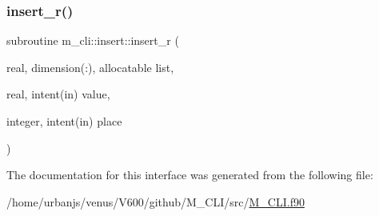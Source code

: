 \mbox{\label{interfacem__cli_1_1insert_af953a8b23ca38f6a5e123d616ad80964}} 
\subsubsection{\texorpdfstring{insert\+\_\+r()}{insert\_r()}}
{\footnotesize\ttfamily subroutine m\+\_\+cli\+::insert\+::insert\+\_\+r (\begin{DoxyParamCaption}\item[{real, dimension(\+:), allocatable}]{list,  }\item[{real, intent(in)}]{value,  }\item[{integer, intent(in)}]{place }\end{DoxyParamCaption})\hspace{0.3cm}{\ttfamily [private]}}



The documentation for this interface was generated from the following file\+:\begin{DoxyCompactItemize}
\item 
/home/urbanjs/venus/\+V600/github/\+M\+\_\+\+C\+L\+I/src/\mbox{\hyperlink{M__CLI_8f90}{M\+\_\+\+C\+L\+I.\+f90}}\end{DoxyCompactItemize}

